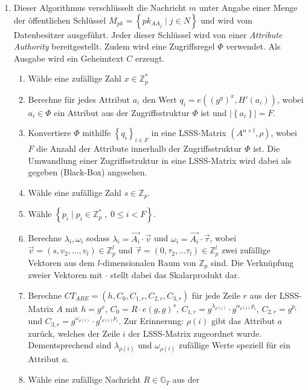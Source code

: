 \begin{enumerate}
	\item {} Dieser Algorithmus
		ver\-schlüs\-selt die Nachricht $m$ unter Angabe einer Menge der
		öffent\-lich\-en Schlüssel $M_{pk} = \left\{ pk_{AA_j} \;\vert\; j \in N
			\right\}$ und wird vom Datenbesitzer ausgeführt. Jeder dieser Schlüssel
			wird von einer \textit{Attribute Authority} bereitgestellt. Zudem wird
			eine Zugriffsregel $\Phi$ verwendet. Als Ausgabe
			wird ein Geheimtext $C$ erzeugt.
		\begin{enumerate}
			\item Wähle eine zufällige Zahl $x \in \mathbb{Z}^*_p$
			\item Berechne für jedes Attribut $a_i$ den Wert $q_i = e((g^y)^x, H'(a_i))$,
				wobei $a_i \in \Phi$ ein Attribut aus der Zugriffsstruktur $\Phi$ ist
				und $\lvert\left\{a_i\right\}\rvert = F$.
			\item Konvertiere $\Phi$ mithilfe $\left\{q_i\right\}_{i \in F}$ in eine
				LSSS-Matrix $\left( A^{n \times l}, \rho \right)$, wobei $F$ die Anzahl
				der Attribute innerhalb der Zugriffsstruktur $\Phi$ ist. Die Umwandlung
				einer Zugriffsstruktur in eine LSSS-Matrix wird dabei als gegeben
				(Black-Box) angesehen.
			\item Wähle eine zufällige Zahl $s \in \mathbb{Z}_p$.
			\item Wähle $\left\{ p_i \;\vert\; p_i \in \mathbb{Z}^*_p \;,\; 0 \leq i < F
				\right\}$.
			\item Berechne $\lambda_i, \omega_i$ sodass $\lambda_i = \vec{A_i} \cdot
				\vec{v}$ und $\omega_i = \vec{A_i} \cdot \vec{\tau}$, wobei $\vec{v} =
				\left( s, v_2, ..., v_l \right) \in \mathbb{Z}^l_p$ und $\vec{\tau} =
				\left( 0, \tau_2, ... \tau_l \right) \in \mathbb{Z}^l_p$ zwei zufällige
				Vektoren aus dem $l$-dimensionalen Raum von $\mathbb{Z}_p$ sind. Die
				Verknüpfung zweier Vektoren mit $\cdot$ stellt dabei das Skalarprodukt
				dar.
			\item Berechne $CT_{ABE} = \left(h, C_0, C_{1,r}, C_{2,r}, C_{3,r}\right)$
				für jede Zeile $r$ aus der LSSS-Matrix $A$ mit
				$h = g^x$,
				$C_0 = R \cdot e(g, g)^s$,
				$C_{1,r} = g^{\lambda_{\rho(i)}} \cdot g^{\alpha_{\rho(i)}p_i}$,
				$C_{2,r} = g^{p_i}$ und 
				$C_{3,r} = g^{\omega_{\rho(i)}} \cdot g^{t_{\rho(i)}p_i}$.
				Zur Erinnerung: $\rho(i)$ gibt das Attribut $a$
				zurück, welches der Zeile $i$ der LSSS-Matrix zugeordnet wurde.
				Dementsprechend sind $\lambda_{\rho(i)}$ und $\omega_{\rho(i)}$
				zufällige Werte speziell für ein Attribut $a$.
			\item Wähle eine zufällige Nachricht $R \in \mathbb{G}_T$ aus der

\end{enumerate}
\end{enumerate}
